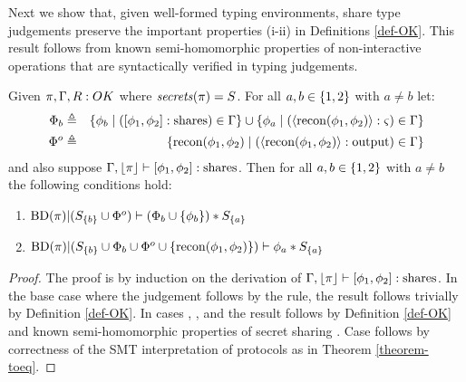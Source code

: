 Next we show that, given well-formed typing environments, share type judgements preserve
the important properties (i-ii) in Definitions \ref{def-OK}. This result follows from
known semi-homomorphic properties of non-interactive operations that are syntactically
verified in typing judgements.
\begin{lemma}
  \label{lemma-sty-noninteractive-sound}
  Given $\pi,\Gamma,R : {OK}$ where $\mathit{secrets}(\pi) = S$. For all $a,b\in \{ 1,2 \}$ with $a \ne b$ let:
  \begin{eqnarray*}
    \Phi_b & \defeq & \setit{ \phi_b \mid ([\phi_1,\phi_2] : \sharety) \in \Gamma} \cup
                        \setit{ \phi_a \mid (\pubx{\recon(\phi_1,\phi_2)} : \sty) \in \Gamma} \\%
    \Phi^o & \defeq & \setit{ \recon(\phi_1,\phi_2) \mid (\pubx{\recon(\phi_1,\phi_2)} : \outty) \in \Gamma}
  \end{eqnarray*} 
  and also suppose $\Gamma, \lfloor \pi \rfloor \vdash [\phi_1,\phi_2] : \mathrm{shares}$.
  Then for all $a,b \in \{ 1,2 \}$ with $a \ne b$ the following conditions hold:
    \begin{enumerate}[\hspace{5mm}i.]
    \item
      $
      \mathrm{BD}(\pi)|(S_{\{ b \}} \cup \Phi^o) \vdash (\Phi_b \cup \{ \phi_b \}) * S_{\{ a \}}
      $
    \item
       $\mathrm{BD}(\pi)|(S_{\{ b \}} \cup  \Phi_b \cup \Phi^o \cup \{ \mathrm{recon}(\phi_1,\phi_2) \}) \vdash \phi_a * S_{\{ a \}}$
    \end{enumerate}
\end{lemma}
\begin{proof}
  The proof is by induction on the derivation of $\Gamma, \lfloor \pi \rfloor \vdash [\phi_1,\phi_2] : \mathrm{shares}$.
  In the base case where the judgement follows by the  rule, the result
  follows trivially by Definition \ref{def-OK}. In cases , , and
   the result follows by Definition \ref{def-OK} and known
  semi-homomorphic properties of secret sharing \cite{10.1007/978-3-030-68869-1_3}.
  Case  follows by correctness of the SMT interpretation of
  protocols as in Theorem \ref{theorem-toeq}.
\end{proof}

